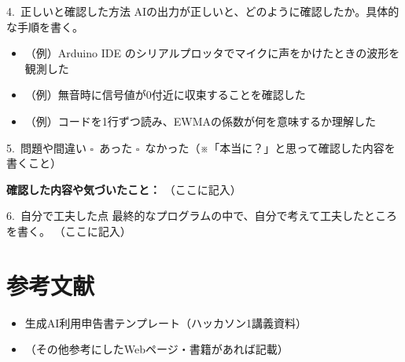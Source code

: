 \documentclass[a4paper,11pt,dvipdfmx]{jsarticle}
\newcommand{\cboxoff}{$\square$\ }
\begin{document}
\begin{itembox}{4.\ 正しいと確認した方法}
AIの出力が正しいと、どのように確認したか。具体的な手順を書く。

\begin{itemize}
  \item （例）Arduino IDE のシリアルプロッタでマイクに声をかけたときの波形を観測した
  \item （例）無音時に信号値が0付近に収束することを確認した
  \item （例）コードを1行ずつ読み、EWMAの係数が何を意味するか理解した
\end{itemize}
\end{itembox}

\begin{itembox}{5.\ 問題や間違い}
\cboxoff あった\quad
\cboxoff なかった（※「本当に？」と思って確認した内容を書くこと）

\vspace{4pt}
\textbf{確認した内容や気づいたこと：}
（ここに記入）
\end{itembox}

\begin{itembox}{6.\ 自分で工夫した点}
最終的なプログラムの中で、自分で考えて工夫したところを書く。
（ここに記入）
\end{itembox}

\section*{参考文献}
\begin{itemize}
  \item 生成AI利用申告書テンプレート（ハッカソン1講義資料）
  \item （その他参考にしたWebページ・書籍があれば記載）
\end{itemize}
\end{document}
